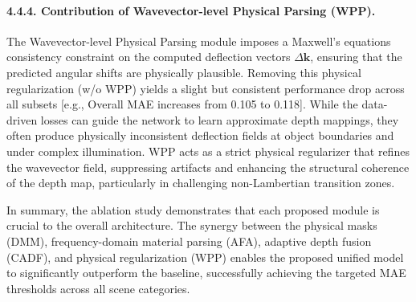 \paragraph{4.4.4. Contribution of Wavevector-level Physical Parsing (WPP).}
The Wavevector-level Physical Parsing module imposes a Maxwell's equations consistency constraint on the computed deflection vectors $\Delta\bm{k}$, ensuring that the predicted angular shifts are physically plausible. Removing this physical regularization (w/o WPP) yields a slight but consistent performance drop across all subsets  [e.g., Overall MAE increases from 0.105 to 0.118]. While the data-driven losses can guide the network to learn approximate depth mappings, they often produce physically inconsistent deflection fields at object boundaries and under complex illumination. WPP acts as a strict physical regularizer that refines the wavevector field, suppressing artifacts and enhancing the structural coherence of the depth map, particularly in challenging non-Lambertian transition zones. 

In summary, the ablation study demonstrates that each proposed module is crucial to the overall architecture. The synergy between the physical masks (DMM), frequency-domain material parsing (AFA), adaptive depth fusion (CADF), and physical regularization (WPP) enables the proposed unified model to significantly outperform the baseline, successfully achieving the targeted MAE thresholds across all scene categories.
